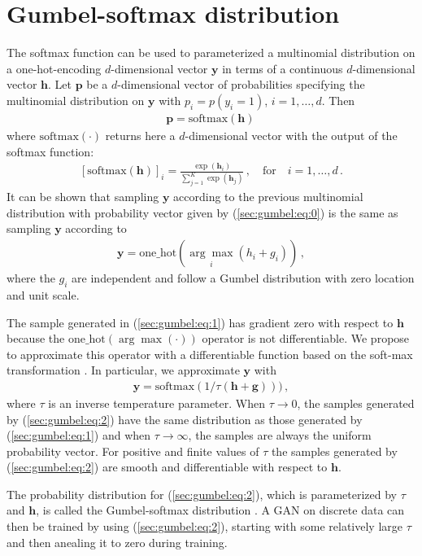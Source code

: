 
\section{Gumbel-softmax distribution}

The softmax function can be used to parameterized a multinomial distribution
on a one-hot-encoding $d$-dimensional vector $\mathbf{y}$ in terms of a
continuous $d$-dimensional vector $\mathbf{h}$. Let $\mathbf{p}$ be a $d$-dimensional vector of probabilities
specifying the multinomial distribution on $\mathbf{y}$ with $p_i = p(y_i=1)$, $i=1,\ldots,d$. Then
\begin{align}
\mathbf{p} = \text{softmax}(\mathbf{h})\,\label{sec:gumbel:eq:0}
\end{align}
where $\text{softmax}(\cdot)$ returns here a $d$-dimensional vector with the output of the softmax function:
\begin{align}
\left[\text{softmax}(\mathbf{h})\right]_i = \frac{\exp(\mathbf{h}_i)}{\sum_{j=1}^K\exp(\mathbf{h}_j)}\,,\quad\text{for}\quad i = 1,\ldots,d\,. \label{sec:gumbel:eq:softmax_dim}
\end{align}
It can be shown that sampling $\mathbf{y}$ according to the previous multinomial distribution with probability vector 
given by (\ref{sec:gumbel:eq:0}) is the same as sampling $\mathbf{y}$ according to
\begin{align}
\mathbf{y} = \text{one\_hot}(\underset{i}{\arg\max} (h_i + g_i))\,,\label{sec:gumbel:eq:1}
\end{align}
where the $g_i$ are independent and follow a Gumbel distribution with zero location and unit scale.

The sample generated in (\ref{sec:gumbel:eq:1}) has gradient zero with respect to
$\mathbf{h}$ because the $\text{one\_hot}(\arg\max(\cdot))$
operator is not differentiable.
We propose to approximate this operator with a differentiable function based on the soft-max transformation \cite{jang2016categorical}.
In particular, we approximate $\mathbf{y}$ with 
\begin{align}
\mathbf{y} = \text{softmax}(1 / \tau (\mathbf{h} + \mathbf{g})))\,,\label{sec:gumbel:eq:2}
\end{align}
where $\tau$ is an inverse temperature parameter. When $\tau \rightarrow 0$, the samples generated by (\ref{sec:gumbel:eq:2})
have the same distribution as those generated by (\ref{sec:gumbel:eq:1}) and when $\tau \rightarrow \infty$,
the samples are always the uniform probability vector. For positive and finite values
of $\tau$ the samples generated by (\ref{sec:gumbel:eq:2}) are smooth and differentiable with respect to $\mathbf{h}$.

The probability distribution for (\ref{sec:gumbel:eq:2}), which is
parameterized by $\tau$ and $\mathbf{h}$, is called the Gumbel-softmax
distribution \cite{jang2016categorical}. A GAN on discrete data can then be
trained by using (\ref{sec:gumbel:eq:2}), starting with some relatively large
$\tau$ and then anealing it to zero during training.

